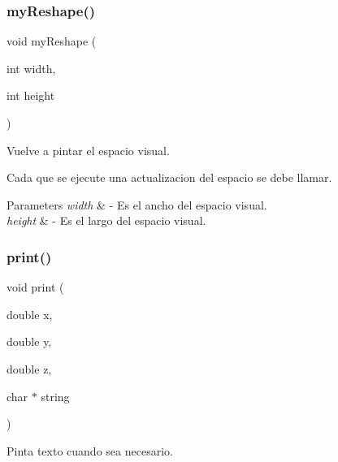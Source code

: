 \subsubsection{\texorpdfstring{my\+Reshape()}{myReshape()}}
{\footnotesize\ttfamily void my\+Reshape (\begin{DoxyParamCaption}\item[{int}]{width,  }\item[{int}]{height }\end{DoxyParamCaption})}



Vuelve a pintar el espacio visual. 

Cada que se ejecute una actualizacion del espacio se debe llamar. 
\begin{DoxyParams}{Parameters}
{\em width} & -\/ Es el ancho del espacio visual. \\
\hline
{\em height} & -\/ Es el largo del espacio visual. \\
\hline
\end{DoxyParams}
\mbox{\label{interfaz-grafica_8h_aa50584771327fb90979684f968197158}} 
\subsubsection{\texorpdfstring{print()}{print()}}
{\footnotesize\ttfamily void print (\begin{DoxyParamCaption}\item[{double}]{x,  }\item[{double}]{y,  }\item[{double}]{z,  }\item[{char $\ast$}]{string }\end{DoxyParamCaption})}



Pinta texto cuando sea necesario. 

